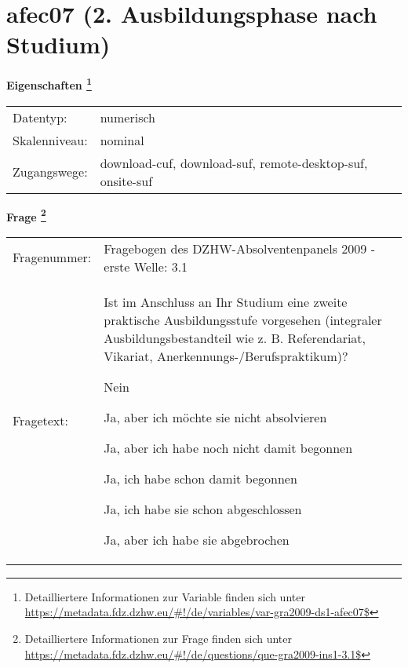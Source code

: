 
    \setcounter{footnote}{0}

    \vspace*{-1.8cm}
	\section{afec07 (2. Ausbildungsphase nach Studium)}
	\label{section:afec07}



    \vspace*{0.5cm}
    \noindent\textbf{Eigenschaften
	\footnote{Detailliertere Informationen zur Variable finden sich unter
		\url{https://metadata.fdz.dzhw.eu/\#!/de/variables/var-gra2009-ds1-afec07$}}}\\
	\begin{tabularx}{\hsize}{@{}lX}
	Datentyp: & numerisch \\
	Skalenniveau: & nominal \\
	Zugangswege: &
	  download-cuf, 
	  download-suf, 
	  remote-desktop-suf, 
	  onsite-suf
 \\
    \end{tabularx}



				\vspace*{0.5cm}
                \noindent\textbf{Frage
	                \footnote{Detailliertere Informationen zur Frage finden sich unter
		              \url{https://metadata.fdz.dzhw.eu/\#!/de/questions/que-gra2009-ins1-3.1$}}}\\
				\begin{tabularx}{\hsize}{@{}lX}
					Fragenummer: &
					  Fragebogen des DZHW-Absolventenpanels 2009 - erste Welle:
					  3.1
 \\
					Fragetext: & Ist im Anschluss an Ihr Studium eine zweite praktische Ausbildungsstufe vorgesehen (integraler Ausbildungsbestandteil wie z. B. Referendariat, Vikariat, Anerkennungs-/Berufspraktikum)?\par  Nein\par  Ja, aber ich möchte sie nicht absolvieren\par  Ja, aber ich habe noch nicht damit begonnen\par  Ja, ich habe schon damit begonnen\par  Ja, ich habe sie schon abgeschlossen\par  Ja, aber ich habe sie abgebrochen \\
				\end{tabularx}





